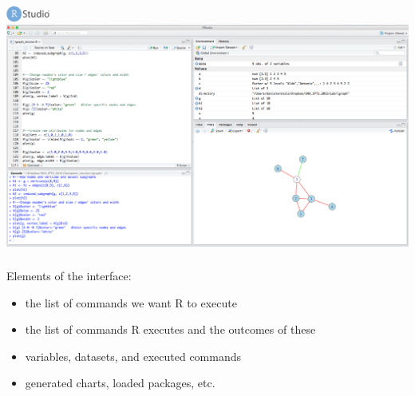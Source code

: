 \documentclass[8pt]{beamer}
\begin{document}

\begin{frame}
\frametitle{\insertsection}

\includegraphics[height=0.5cm]{../_shared_pics/rstudio_logo}\\
\includegraphics[width=\linewidth,frame]{rstudio_interface}

\end{frame}


\begin{frame}
\frametitle{\insertsection}

Elements of the interface:
\begin{itemize}
\item {\color{blue}{Script:}} the list of commands we want R to execute
\item {\color{blue}{Console:}} the list of commands R executes and the outcomes of these
\item {\color{blue}{Environment, History:}} variables, datasets, and  executed commands
\item {\color{blue}{Files, Plot, Packages, Help, Viewer:}} generated charts, loaded packages, etc.
\end{itemize}

\end{frame}

\end{document}
